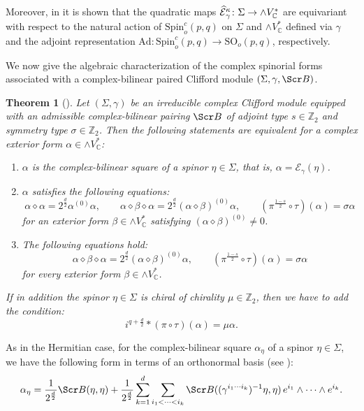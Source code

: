 \documentclass[10pt,a4paper,twoside,reqno]{amsart}
\theoremstyle{plain}
\newtheorem{thm}{Theorem}[section]
\theoremstyle{definition}
\theoremstyle{remark}
\def\Z{\mathbb{Z}}
\def\C{\mathbb{C}}
\def\Ad{\mathrm{Ad}}
\def\scB{\Scr B}
\def\Spin{\mathrm{Spin}}
\def\Spin{\mathrm{Spin}}
\def\SO{\mathrm{SO}}
\def\cE{\mathcal{E}}
\def\hcE{\smash{\widehat{\mathcal{E}}}}
\begin{document}
Moreover, in \cite[Section 3.3]{Algebraic_Complex_Square_2025} it is shown that the quadratic maps $\hcE_\gamma^\kappa \colon \Sigma \to \wedge V^*_\C$ are equivariant with respect to the natural action of $\Spin_o^c(p,q)$ on $\Sigma$ and $\wedge V^*_\C$ defined via $\gamma$ and the adjoint representation $\Ad\colon \Spin_o^c(p,q) \to \SO_o(p,q)$, respectively.\medskip

We now give the algebraic characterization of the complex spinorial forms associated with a complex-bilinear paired Clifford module $(\Sigma,\gamma,\scB)$.

\begin{thm}[{\cite[Thm.\ 3.22 and Cor.\ 3.24]{Algebraic_Complex_Square_2025}}]\label{thm:bilinearsquare}
    Let $(\Sigma,\gamma)$ be an irreducible complex Clifford module equipped with an admissible complex-bilinear pairing $\scB$ of adjoint type $s\in \mathbb{Z}_2$ and symmetry type $\sigma\in \mathbb{Z}_2$. Then the following statements are equivalent for a complex exterior form $\alpha\in\wedge V^*_\C$: \begin{enumerate}
        \item[\normalfont(a)] $\alpha$ is the complex-bilinear square of a spinor $\eta\in\Sigma$, that is, $\alpha=\cE_\gamma(\eta)$.
        \item[\normalfont(b)] $\alpha$ satisfies the following equations: $$\alpha\diamond\alpha = 2^{\frac{d}{2}} \alpha^{(0)}\alpha,\qquad \alpha \diamond \beta \diamond \alpha = 2^{\frac{d}{2}}(\alpha\diamond\beta)^{(0)}\alpha,\qquad (\pi^{\frac{1-s}{2}}\circ\tau) (\alpha) = \sigma \alpha$$ for an exterior form $\beta\in\wedge V^*_\C$ satisfying $(\alpha\diamond\beta)^{(0)} \neq 0$.
        \item[\normalfont(c)] The following equations hold: $$\alpha \diamond \beta \diamond \alpha = 2^{\frac{d}{2}}(\alpha\diamond\beta)^{(0)}\alpha,\qquad (\pi^{\frac{1-s}{2}}\circ\tau) (\alpha) = \sigma \alpha$$ for every exterior form $\beta\in\wedge V^*_\C$.
    \end{enumerate}
    
    If in addition the spinor $\eta\in\Sigma$ is chiral of chirality $\mu\in\Z_2$, then we have to add the condition: $$i^{q+\frac{d}{2}}*(\pi\circ\tau)(\alpha)=\mu\alpha.$$
\end{thm}

As in the Hermitian case, for the complex-bilinear square $\alpha_\eta$ of a spinor $\eta\in\Sigma$, we have the following form in terms of an orthonormal basis (see \cite[Eq.\ 13]{Algebraic_Complex_Square_2025}): \begin{equation*}\label{eq:explicitbilinear}
    \alpha_{\eta} = \frac{1}{2^{\frac{d}{2}}} \scB(\eta,\eta) + \frac{1}{2^{\frac{d}{2}}} \sum_{k=1}^d \sum_{i_1 < \cdots < i_k} \scB((\gamma^{i_1 \cdots i_k})^{-1}\eta , \eta)\, e^{i_1}\wedge  \cdots \wedge e^{i_k}.
\end{equation*}
\end{document}
